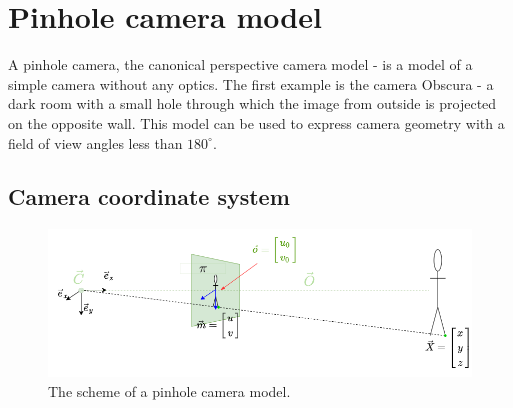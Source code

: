


\section{Pinhole camera model}
\label{sec:pinhole_camera_model}
A pinhole camera, the canonical perspective camera model - is a model of a simple camera without any optics.
The first example is the camera Obscura - a dark room with a small hole through which the image from outside is projected on the opposite wall. 
This model can be used to express camera geometry with a field of view angles less than $180^{\circ}$.

\subsection{Camera coordinate system}
\begin{figure}[ht]
    \centering
    \includegraphics[width=\textwidth]{graphics/td_scene.png}
    \caption{The scheme of a pinhole camera model.}
    \label{fig:td_scene_3d}
\end{figure}

